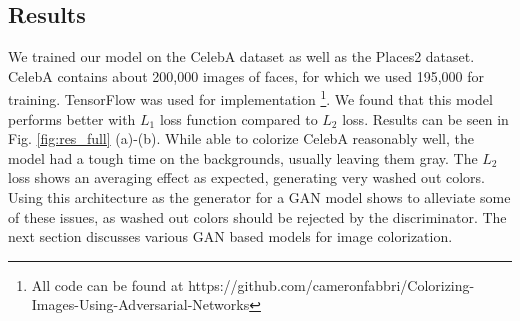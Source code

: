 \documentclass[10pt]{article}
\begin{document}
\subsection{\textbf{Results}}
We trained our model on the CelebA dataset \cite{celebA} as well as the Places2 \cite{places2} dataset. CelebA contains about 200,000 images of faces, for which we used 195,000 for training.
TensorFlow \cite{abadi2016tensorflow} was used for implementation \footnote{All code can be found at https://github.com/cameronfabbri/Colorizing-Images-Using-Adversarial-Networks}.
We found that this model performs better with $L_1$ loss function compared to $L_2$ loss. Results can be seen in Fig. \ref{fig:res_full} (a)-(b). %
While able to colorize CelebA reasonably well, the model had a tough time on the backgrounds, usually leaving them gray. The $L_2$ loss shows an averaging effect as expected, generating very washed out colors.
Using this architecture as the generator for a GAN model shows to alleviate some of these issues, as washed out colors should be rejected by the discriminator. The next section discusses various GAN based models for image
colorization.

\end{document}
